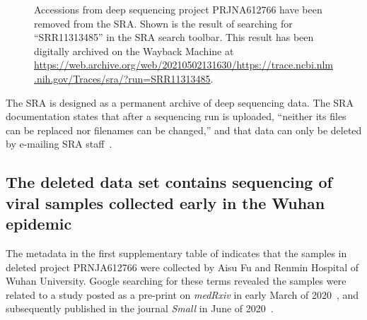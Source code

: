 \documentclass[9pt,twocolumn,twoside]{gsajnl_modified}
\begin{document}
\begin{figure}[]
\centering
\caption{Accessions from deep sequencing project PRJNA612766 have been removed from the SRA.
Shown is the result of searching for ``SRR11313485'' in the SRA search toolbar.
This result has been digitally archived on the Wayback Machine at \url{https://web.archive.org/web/20210502131630/https://trace.ncbi.nlm.nih.gov/Traces/sra/?run=SRR11313485}.
}%
\label{fig:acc_removed}
\end{figure}

The SRA is designed as a permanent archive of deep sequencing data.
The SRA documentation states that after a sequencing run is uploaded, ``neither its files can be replaced nor filenames can be changed,'' and that data can only be deleted by e-mailing SRA staff~\citep{SRA_deletion}.

\subsection{The deleted data set contains sequencing of viral samples collected early in the Wuhan epidemic}
The metadata in the first supplementary table of \citet{farkas2020insights} indicates that the samples in deleted project PRNJA612766 were collected by Aisu Fu and Renmin Hospital of Wuhan University.
Google searching for these terms revealed the samples were related to a study posted as a pre-print on \textit{medRxiv} in early March of 2020~\citep{wang2020medRxiv}, and subsequently published in the journal \textit{Small} in June of 2020~\citep{wang2020small}.
\end{document}
